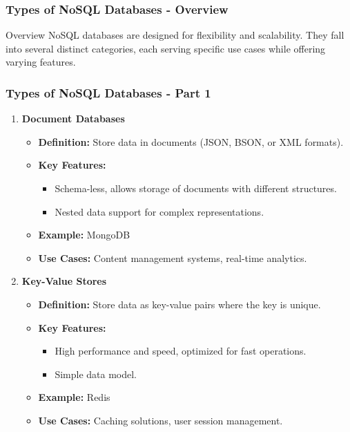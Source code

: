 \documentclass[aspectratio=169]{beamer}
\begin{document}
\begin{frame}[fragile]
  \frametitle{Types of NoSQL Databases - Overview}
  \begin{block}{Overview}
    NoSQL databases are designed for flexibility and scalability. They fall into several distinct categories, each serving specific use cases while offering varying features.
  \end{block}
\end{frame}

\begin{frame}[fragile]
  \frametitle{Types of NoSQL Databases - Part 1}
  \begin{enumerate}
    \item \textbf{Document Databases}
      \begin{itemize}
        \item \textbf{Definition:} Store data in documents (JSON, BSON, or XML formats).
        \item \textbf{Key Features:}
          \begin{itemize}
            \item Schema-less, allows storage of documents with different structures.
            \item Nested data support for complex representations.
          \end{itemize}
        \item \textbf{Example:} MongoDB
        \item \textbf{Use Cases:} Content management systems, real-time analytics.
      \end{itemize}
      
    \item \textbf{Key-Value Stores}
      \begin{itemize}
        \item \textbf{Definition:} Store data as key-value pairs where the key is unique.
        \item \textbf{Key Features:}
          \begin{itemize}
            \item High performance and speed, optimized for fast operations.
            \item Simple data model.
          \end{itemize}
        \item \textbf{Example:} Redis
        \item \textbf{Use Cases:} Caching solutions, user session management.
      \end{itemize}
  \end{enumerate}
\end{frame}
\end{document}
